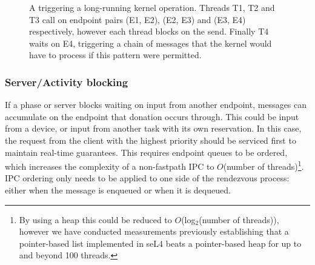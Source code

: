 \begin{figure}
\centering
\caption{A \sendwait triggering a long-running kernel operation. Threads T1, T2 and T3 call \sendwait on endpoint pairs (E1, E2), (E2, E3) and (E3, E4) respectively, however each thread blocks on the send. Finally T4 waits on E4, triggering a chain of messages that the kernel would have to process if this pattern were permitted.}
\label{fig:sendwait-chain}
\end{figure}

\subsubsection{Server/Activity blocking}

If a phase or server blocks waiting on input from another endpoint, messages can accumulate on the endpoint that donation occurs through.
This could be input from a device, or input from another task with its own reservation.
In this case, the request from the client with the highest priority should be serviced first to maintain real-time guarantees.
This requires endpoint queues to be ordered, which increases the complexity of a non-fastpath IPC to $O$(number of threads)\footnote{By using a heap this could be reduced to $O$(log$_{2}$(number of threads)), however we have conducted measurements previously establishing that a pointer-based list implemented in seL4 beats a pointer-based heap for up to and beyond 100 threads.}.
IPC ordering only needs to be applied to one side of the rendezvous process: either when the message is enqueued or when it is dequeued.

